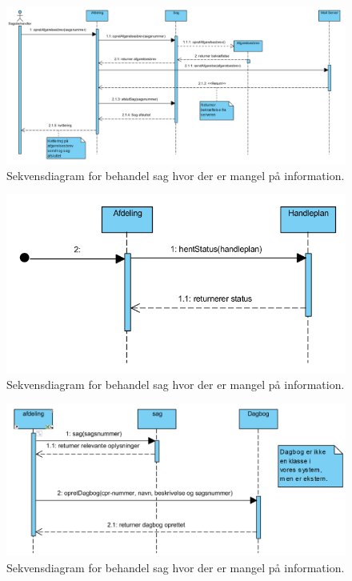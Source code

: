 \begin{figure}[hbt!]
  \includegraphics[width=\linewidth]{./PNG/sekDiaAfgoereSagsbehandAfgoerelse.PNG} 
  \caption{Sekvensdiagram for behandel sag hvor der er mangel på information.}
  \label{fig:ASAf}
\end{figure}
\newpage
\begin{figure}[hbt!]
  \includegraphics[width=\linewidth]{./PNG/sekDiaAfgoereSagsbehandFaerdig.PNG} 
  \caption{Sekvensdiagram for behandel sag hvor der er mangel på information.}
  \label{fig:ASFaer}
\end{figure}

\begin{figure}[hbt!]
  \includegraphics[width=\linewidth]{./PNG/sekDiaAfgoereSagsbehandOpret.PNG} 
  \caption{Sekvensdiagram for behandel sag hvor der er mangel på information.}
  \label{fig:ASOpret}
\end{figure}
\newpage
